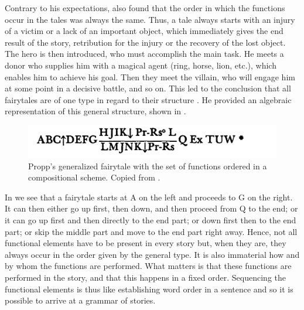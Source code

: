 \documentclass[output=paper]{langscibook}
\begin{document}
Contrary to his expectations, {\Propp} also found that the order in which the functions occur in the tales was always the same. Thus, a tale always starts with an injury of a victim or a lack of an important object, which immediately gives the end result of the story, retribution for the injury or the recovery of the lost object. The hero is then introduced, who must accomplish the main task. He meets a donor who supplies him with a magical agent (ring, horse, lion, etc.), which enables him to achieve his goal. Then they meet the villain, who will engage him at some point in a decisive battle, and so on. This led {\Propp} to the conclusion that all fairytales are of one type in regard to their structure \citep[23]{Propp1968}. He provided an algebraic representation of this general structure, shown in .

\begin{figure} 
    \includegraphics[width=\textwidth]{figures/Propp.png}
    \caption{Propp's generalized fairytale with the set of functions ordered in a compositional scheme. Copied from \cite[105]{Propp1968}.}
    \label{fig:karstens:proppfairytale}
\end{figure}

In  we see that a fairytale starts at A on the left and proceeds to G on the right. It can then either go up first, then down, and then proceed from Q to the end; or it can go up first and then directly to the end part; or down first then to the end part; or skip the middle part and move to the end part right away. Hence, not all functional elements have to be present in every story but, when they are, they always occur in the order given by the general type. It is also immaterial how and by whom the functions are performed. What matters is that these functions are performed in the story, and that this happens in a fixed order. Sequencing the functional elements is thus like establishing word order in a sentence and so it is possible to arrive at a grammar of stories. 
\end{document}
